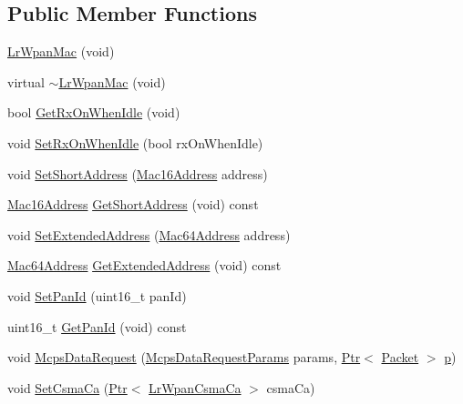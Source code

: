 \subsection*{Public Member Functions}
\begin{DoxyCompactItemize}
\item 
\hyperlink{classns3_1_1LrWpanMac_ae85526f526890de95937d9e6f1771403}{Lr\+Wpan\+Mac} (void)
\item 
virtual \hyperlink{classns3_1_1LrWpanMac_a2623548467b001bd553496eec58f4f04}{$\sim$\+Lr\+Wpan\+Mac} (void)
\item 
bool \hyperlink{classns3_1_1LrWpanMac_a38ea561fb6884c785fff93535a4bd9e9}{Get\+Rx\+On\+When\+Idle} (void)
\item 
void \hyperlink{classns3_1_1LrWpanMac_a12281b242d499c542bb1ee5589a7e0d0}{Set\+Rx\+On\+When\+Idle} (bool rx\+On\+When\+Idle)
\item 
void \hyperlink{classns3_1_1LrWpanMac_af8661b97dc1aa6de91d91c3f8d2d6d7b}{Set\+Short\+Address} (\hyperlink{classns3_1_1Mac16Address}{Mac16\+Address} address)
\item 
\hyperlink{classns3_1_1Mac16Address}{Mac16\+Address} \hyperlink{classns3_1_1LrWpanMac_ad4aad83b81f2bea0ddb7e14e6280f946}{Get\+Short\+Address} (void) const 
\item 
void \hyperlink{classns3_1_1LrWpanMac_a3a4c809c6159ba09e5fbe803bb295a5d}{Set\+Extended\+Address} (\hyperlink{classns3_1_1Mac64Address}{Mac64\+Address} address)
\item 
\hyperlink{classns3_1_1Mac64Address}{Mac64\+Address} \hyperlink{classns3_1_1LrWpanMac_a3602b57e8b460359c7f32854ca50e954}{Get\+Extended\+Address} (void) const 
\item 
void \hyperlink{classns3_1_1LrWpanMac_a86e890821eabb96e593c2c5ce8c7fdbe}{Set\+Pan\+Id} (uint16\+\_\+t pan\+Id)
\item 
uint16\+\_\+t \hyperlink{classns3_1_1LrWpanMac_a6a9b119e3bb6e77074c790a65fdf8a6c}{Get\+Pan\+Id} (void) const 
\item 
void \hyperlink{classns3_1_1LrWpanMac_acb3f2c60655d459aeb85b20536d1f7ce}{Mcps\+Data\+Request} (\hyperlink{structns3_1_1McpsDataRequestParams}{Mcps\+Data\+Request\+Params} params, \hyperlink{classns3_1_1Ptr}{Ptr}$<$ \hyperlink{classns3_1_1Packet}{Packet} $>$ \hyperlink{lte__link__budget__x2__handover__measures_8m_ac9de518908a968428863f829398a4e62}{p})
\item 
void \hyperlink{classns3_1_1LrWpanMac_a6e0d04dfb141baf75e47a0189e504430}{Set\+Csma\+Ca} (\hyperlink{classns3_1_1Ptr}{Ptr}$<$ \hyperlink{classns3_1_1LrWpanCsmaCa}{Lr\+Wpan\+Csma\+Ca} $>$ csma\+Ca)

\end{DoxyCompactItemize}
